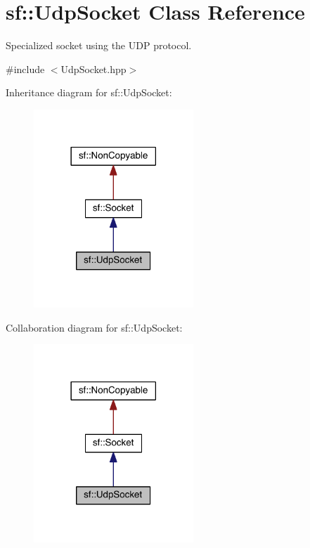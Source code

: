 \hypertarget{classsf_1_1_udp_socket}{\section{sf\-:\-:Udp\-Socket Class Reference}
\label{classsf_1_1_udp_socket}
}


Specialized socket using the U\-D\-P protocol.  




{\ttfamily \#include $<$Udp\-Socket.\-hpp$>$}



Inheritance diagram for sf\-:\-:Udp\-Socket\-:
\nopagebreak
\begin{figure}[H]
\begin{center}
\leavevmode
\includegraphics[width=170pt]{classsf_1_1_udp_socket__inherit__graph}
\end{center}
\end{figure}


Collaboration diagram for sf\-:\-:Udp\-Socket\-:
\nopagebreak
\begin{figure}[H]
\begin{center}
\leavevmode
\includegraphics[width=170pt]{classsf_1_1_udp_socket__coll__graph}
\end{center}
\end{figure}
